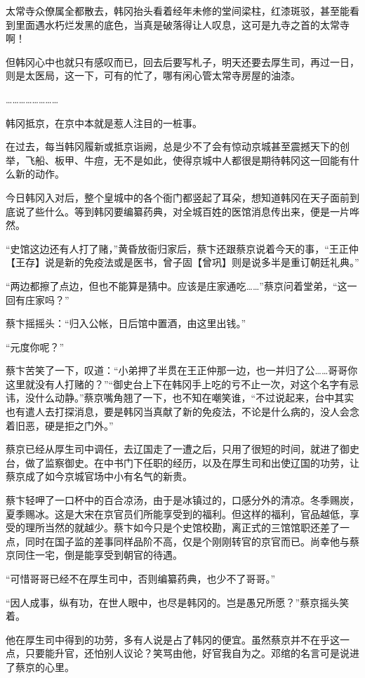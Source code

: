 太常寺众僚属全都散去，韩冈抬头看着经年未修的堂间梁柱，红漆斑驳，甚至能看到里面遇水朽烂发黑的底色，当真是破落得让人叹息，这可是九寺之首的太常寺啊！

但韩冈心中也就只有感叹而已，回去后要写札子，明天还要去厚生司，再过一日，则是太医局，这一下，可有的忙了，哪有闲心管太常寺房屋的油漆。

……………………

韩冈抵京，在京中本就是惹人注目的一桩事。

在过去，每当韩冈履新或抵京诣阙，总是少不了会有惊动京城甚至震撼天下的创举，飞船、板甲、牛痘，无不是如此，使得京城中人都很是期待韩冈这一回能有什么新的动作。

今日韩冈入对后，整个皇城中的各个衙门都竖起了耳朵，想知道韩冈在天子面前到底说了些什么。等到韩冈要编纂药典，对全城百姓的医馆消息传出来，便是一片哗然。

“史馆这边还有人打了赌，”黄昏放衙归家后，蔡卞还跟蔡京说着今天的事，“王正仲【王存】说是新的免疫法或是医书，曾子固【曾巩】则是说多半是重订朝廷礼典。”

“两边都擦了点边，但也不能算是猜中。应该是庄家通吃……”蔡京问着堂弟，“这一回有庄家吗？”

蔡卞摇摇头：“归入公帐，日后馆中置酒，由这里出钱。”

“元度你呢？”

蔡卞苦笑了一下，叹道：“小弟押了半贯在王正仲那一边，也一并归了公……哥哥你这里就没有人打赌的？”“御史台上下在韩冈手上吃的亏不止一次，对这个名字有忌讳，没什么动静。”蔡京嘴角翘了一下，也不知在嘲笑谁，“不过说起来，台中其实也有遣人去打探消息，要是韩冈当真献了新的免疫法，不论是什么病的，没人会念着旧恶，硬是拒之门外。”

蔡京已经从厚生司中调任，去辽国走了一遭之后，只用了很短的时间，就进了御史台，做了监察御史。在中书门下任职的经历，以及在厚生司和出使辽国的功劳，让蔡京成了如今京城官场中小有名气的新贵。

蔡卞轻呷了一口杯中的百合凉汤，由于是冰镇过的，口感分外的清凉。冬季赐炭，夏季赐冰。这是大宋在京官员们所能享受到的福利。但这样的福利，官品越低，享受的理所当然的就越少。蔡卞如今只是个史馆校勘，离正式的三馆馆职还差了一点，同时在国子监的差事同样品阶不高，仅是个刚刚转官的京官而已。尚幸他与蔡京同住一宅，倒是能享受到朝官的待遇。

“可惜哥哥已经不在厚生司中，否则编纂药典，也少不了哥哥。”

“因人成事，纵有功，在世人眼中，也尽是韩冈的。岂是愚兄所愿？”蔡京摇头笑着。

他在厚生司中得到的功劳，多有人说是占了韩冈的便宜。虽然蔡京并不在乎这一点，只要能升官，还怕别人议论？笑骂由他，好官我自为之。邓绾的名言可是说进了蔡京的心里。

